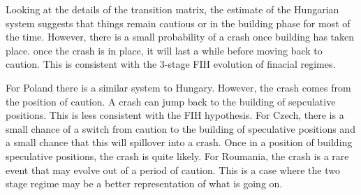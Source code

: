 \documentclass[12pt, a4paper, oneside]{article} %
\begin{document}
Looking at the details of the transition matrix, the estimate of the Hungarian system suggests that things remain cautious or in the building phase for most of the time.  However, there is a small probability of a crash once building has taken place. once the crash is in place, it will last a while before moving back to caution. This is consistent with the 3-stage FIH evolution of finacial regimes. 

For Poland there is a similar system to Hungary.  However, the crash comes from the position of caution.  A crash can jump back to the building of sepculative positions.  This is less consistent with the FIH hypothesis. For Czech, there is a small chance of a switch from caution to the building of speculative positions and a small chance that this will spillover into a crash. Once in a position of building speculative positions, the crash is quite likely.  For Roumania, the crash is a rare event that may evolve out of a period of caution. This is a case where the two stage regime may be a better representation of what is going on. 
\end{document}
